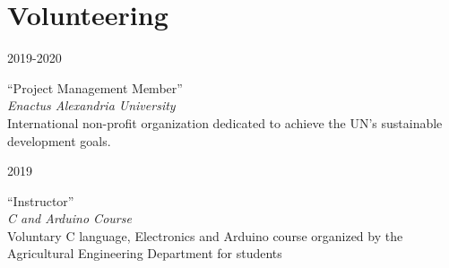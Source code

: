 \documentclass[a4paper]{article}
\newcommand{\entry}[4]{   %
	\begin{center}
		\begin{minipage}[c]{0.25\linewidth}  %
			\vfill
			\hfill  %
			\textsc{#1}  %
			\vfill
		\end{minipage}
		\hfill\vline\hfill  %
		\begin{minipage}[c]{0.7\linewidth}
			\textrm{``#2''} \\
			\textit{#3} \\
			\footnotesize{#4}
		\end{minipage}
	\end{center}
}
\begin{document}
	\section{Volunteering}
		\entry{2019-2020}
			{Project Management Member}
			{Enactus Alexandria University}
			{International non-profit organization dedicated to achieve the UN's sustainable development goals.}
		\entry{2019}
			{Instructor}
			{C and Arduino Course}
			{Voluntary C language, Electronics and Arduino course organized by the Agricultural Engineering Department for students}
\end{document}
